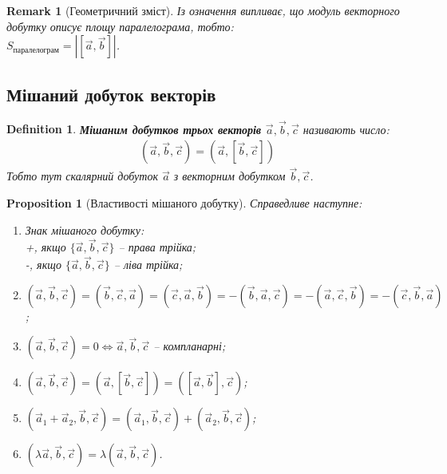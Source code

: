 \documentclass[a4paper, 10pt]{extarticle}
\theoremstyle{theoremdd}
\theoremstyle{theoremdd}
\newtheorem{definition}[theorem]{Definition}
\theoremstyle{theoremdd}
\theoremstyle{theoremdd}
\theoremstyle{theoremdd}
\newtheorem{proposition}[theorem]{Proposition}
\theoremstyle{theoremdd}
\newtheorem{remark}[theorem]{Remark}
\theoremstyle{theoremdd}
\theoremstyle{theoremdd}
\begin{document}
\begin{remark}[Геометричний зміст]
Із означення випливає, що модуль векторного добутку описує площу паралелограма, тобто:\\
$S_{\text{паралелограм}} = |[\vec{a},\vec{b}]|$.
\begin{figure}[H]
\centering
{}
\end{figure}
\end{remark}

\subsection{Мішаний добуток векторів}
\begin{definition}
\textbf{Мішаним добутков трьох векторів $\vec{a}, \vec{b}, \vec{c}$} називають число:
\begin{align*}
(\vec{a}, \vec{b}, \vec{c}) = (\vec{a}, [\vec{b}, \vec{c}])
\end{align*}
Тобто тут скалярний добуток $\vec{a}$ з векторним добутком $\vec{b},\vec{c}$.
\end{definition}

\begin{proposition}[Властивості мішаного добутку]
Справедливе наступне:
\begin{enumerate}[nosep,wide=0pt,label={\arabic*)}]
\item Знак мішаного добутку:\\
+, якщо $\{\vec{a}, \vec{b}, \vec{c}\}$ -- права трійка;\\
-, якщо $\{\vec{a}, \vec{b}, \vec{c}\}$ -- ліва трійка;
\item $(\vec{a}, \vec{b}, \vec{c}) = (\vec{b}, \vec{c}, \vec{a}) = (\vec{c}, \vec{a}, \vec{b}) = -(\vec{b}, \vec{a}, \vec{c}) = -(\vec{a}, \vec{c}, \vec{b}) = -(\vec{c}, \vec{b}, \vec{a})$;
\item $(\vec{a}, \vec{b}, \vec{c}) = 0 \iff \vec{a}, \vec{b}, \vec{c}$ -- компланарні;
\item $(\vec{a}, \vec{b}, \vec{c}) = (\vec{a}, [\vec{b}, \vec{c}]) = ([\vec{a},\vec{b}],\vec{c})$;
\item $(\vec{a}_1+\vec{a}_2, \vec{b}, \vec{c}) = (\vec{a}_1,\vec{b},\vec{c}) + (\vec{a}_2,\vec{b},\vec{c})$;
\item $(\lambda \vec{a}, \vec{b}, \vec{c}) = \lambda (\vec{a},\vec{b},\vec{c})$.
\end{enumerate}
\end{proposition}
\end{document}
